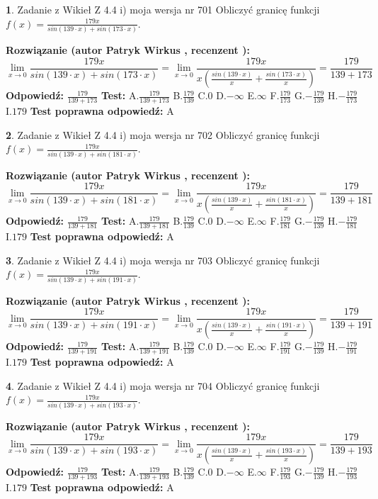 \documentclass[12pt, a4paper]{article}
\theoremstyle{definition} %
\newtheorem{zad}{}
\newcommand{\zadStart}[1]{\begin{zad}#1\newline}
\newcommand{\zadStop}{\end{zad}}
\newcommand{\rozwStart}[2]{\noindent \textbf{Rozwiązanie (autor #1 , recenzent #2): }\newline}
\newcommand{\rozwStop}{\newline}
\newcommand{\odpStart}{\noindent \textbf{Odpowiedź:}\newline}
\newcommand{\odpStop}{\newline}
\newcommand{\testStart}{\noindent \textbf{Test:}\newline}
\newcommand{\testStop}{\newline}
\newcommand{\kluczStart}{\noindent \textbf{Test poprawna odpowiedź:}\newline}
\newcommand{\kluczStop}{\newline}
\begin{document}
\zadStart{Zadanie z Wikieł Z 4.4 i) moja wersja nr 701}
Obliczyć granicę funkcji $f(x)=\frac{179x}{sin(139\cdot x) +sin(173\cdot x)}$.
\zadStop
\rozwStart{Patryk Wirkus}{}
$$\lim\limits_{x\to 0}\frac{179x}{sin(139\cdot x) +sin(173\cdot x)}=\lim\limits_{x\to 0}\frac{179x}{x(\frac{sin(139\cdot x)}{x}+\frac{sin(173\cdot x)}{x})}=\frac{179}{139+173}$$
\rozwStop
\odpStart
$\frac{179}{139+173}$
\odpStop
\testStart
A.$\frac{179}{139+173}$
B.$\frac{179}{139}$
C.$0$
D.$-\infty$
E.$\infty$
F.$\frac{179}{173}$
G.$-\frac{179}{139}$
H.$-\frac{179}{173}$
I.$179$
\testStop
\kluczStart
A
\kluczStop



\zadStart{Zadanie z Wikieł Z 4.4 i) moja wersja nr 702}
Obliczyć granicę funkcji $f(x)=\frac{179x}{sin(139\cdot x) +sin(181\cdot x)}$.
\zadStop
\rozwStart{Patryk Wirkus}{}
$$\lim\limits_{x\to 0}\frac{179x}{sin(139\cdot x) +sin(181\cdot x)}=\lim\limits_{x\to 0}\frac{179x}{x(\frac{sin(139\cdot x)}{x}+\frac{sin(181\cdot x)}{x})}=\frac{179}{139+181}$$
\rozwStop
\odpStart
$\frac{179}{139+181}$
\odpStop
\testStart
A.$\frac{179}{139+181}$
B.$\frac{179}{139}$
C.$0$
D.$-\infty$
E.$\infty$
F.$\frac{179}{181}$
G.$-\frac{179}{139}$
H.$-\frac{179}{181}$
I.$179$
\testStop
\kluczStart
A
\kluczStop



\zadStart{Zadanie z Wikieł Z 4.4 i) moja wersja nr 703}
Obliczyć granicę funkcji $f(x)=\frac{179x}{sin(139\cdot x) +sin(191\cdot x)}$.
\zadStop
\rozwStart{Patryk Wirkus}{}
$$\lim\limits_{x\to 0}\frac{179x}{sin(139\cdot x) +sin(191\cdot x)}=\lim\limits_{x\to 0}\frac{179x}{x(\frac{sin(139\cdot x)}{x}+\frac{sin(191\cdot x)}{x})}=\frac{179}{139+191}$$
\rozwStop
\odpStart
$\frac{179}{139+191}$
\odpStop
\testStart
A.$\frac{179}{139+191}$
B.$\frac{179}{139}$
C.$0$
D.$-\infty$
E.$\infty$
F.$\frac{179}{191}$
G.$-\frac{179}{139}$
H.$-\frac{179}{191}$
I.$179$
\testStop
\kluczStart
A
\kluczStop



\zadStart{Zadanie z Wikieł Z 4.4 i) moja wersja nr 704}
Obliczyć granicę funkcji $f(x)=\frac{179x}{sin(139\cdot x) +sin(193\cdot x)}$.
\zadStop
\rozwStart{Patryk Wirkus}{}
$$\lim\limits_{x\to 0}\frac{179x}{sin(139\cdot x) +sin(193\cdot x)}=\lim\limits_{x\to 0}\frac{179x}{x(\frac{sin(139\cdot x)}{x}+\frac{sin(193\cdot x)}{x})}=\frac{179}{139+193}$$
\rozwStop
\odpStart
$\frac{179}{139+193}$
\odpStop
\testStart
A.$\frac{179}{139+193}$
B.$\frac{179}{139}$
C.$0$
D.$-\infty$
E.$\infty$
F.$\frac{179}{193}$
G.$-\frac{179}{139}$
H.$-\frac{179}{193}$
I.$179$
\testStop
\kluczStart
A
\kluczStop
\end{document}
